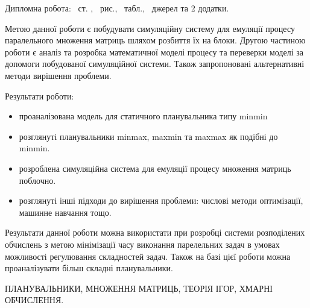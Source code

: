 
Дипломна робота: \pageref*{MyLastPage}~ст. , \totfig~рис.,  \tottab~табл., ~джерел та 2 додатки.

Метою данної роботи є побудувати симуляційну систему для емуляції процесу паралельного множення матриць шляхом розбиття їх на блоки. Другою частиною роботи є аналіз та розробка математичної моделі процесу та переверки моделі за допомоги побудованої симуляційної системи. Також запропоновані альтернативні методи вирішення проблеми.

Результати роботи:
\begin{itemize}
	\item проаналізована модель для статичного планувальника типу minmin
	\item розглянуті планувальники minmax, maxmin та maxmax як подібні до minmin.
	\item розроблена симуляційна система для емуляції процесу множення матриць поблочно.
	\item розглянуті інші підходи до вирішення проблеми: числові методи оптимізації, машинне навчання тощо.
\end{itemize}

Результати данної роботи можна використати при розробці системи розподілених обчислень з метою мінімізації часу виконання парелельних задач в умовах можливості регулювання складностей задач. Також на базі цієї роботи можна проаналізувати більш складні планувальники.

\MakeUppercase{Планувальники, множення матриць, теорія ігор, хмарні обчислення.}